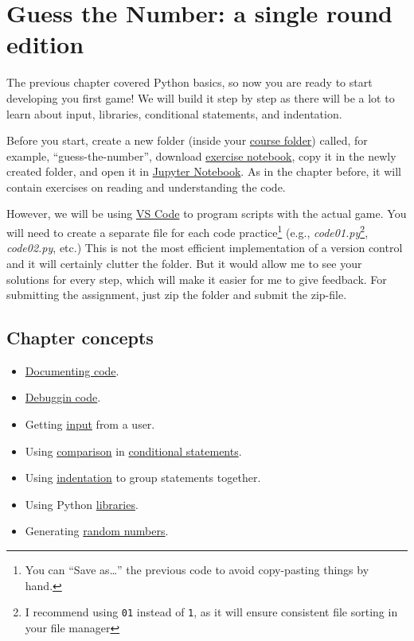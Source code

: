 \documentclass[
]{book}
\providecommand{\tightlist}{%
  \setlength{\itemsep}{0pt}\setlength{\parskip}{0pt}}
\begin{document}
\hypertarget{guess-the-number-single-round}{%
\chapter{Guess the Number: a single round edition}\label{guess-the-number-single-round}}

The previous chapter covered Python basics, so now you are ready to start developing you first game! We will build it step by step as there will be a lot to learn about input, libraries, conditional statements, and indentation.

Before you start, create a new folder (inside your \protect\hyperlink{files-folder}{course folder}) called, for example, ``guess-the-number'', download \href{notebooks/Seminar\%2002.\%20Guess\%20the\%20number\%20-\%20single\%20round.ipynb}{exercise notebook}, copy it in the newly created folder, and open it in \protect\hyperlink{jupyter-notebooks}{Jupyter Notebook}. As in the chapter before, it will contain exercises on reading and understanding the code.

However, we will be using \protect\hyperlink{install-vs-code}{VS Code} to program scripts with the actual game. You will need to create a separate file for each code practice\footnote{You can ``Save as\ldots{}'' the previous code to avoid copy-pasting things by hand.} (e.g., \emph{code01.py}\footnote{I recommend using \texttt{01} instead of \texttt{1}, as it will ensure consistent file sorting in your file manager}, \emph{code02.py}, etc.) This is not the most efficient implementation of a version control and it will certainly clutter the folder. But it would allow me to see your solutions for every step, which will make it easier for me to give feedback. For submitting the assignment, just zip the folder and submit the zip-file.

\hypertarget{chapter-concepts-1}{%
\section{Chapter concepts}\label{chapter-concepts-1}}

\begin{itemize}
\tightlist
\item
  \protect\hyperlink{documenting-your-code}{Documenting code}.
\item
  \protect\hyperlink{debugging}{Debuggin code}.
\item
  Getting \protect\hyperlink{input-function}{input} from a user.
\item
  Using \protect\hyperlink{comparisons}{comparison} in \protect\hyperlink{if-statement}{conditional statements}.
\item
  Using \protect\hyperlink{indentation}{indentation} to group statements together.
\item
  Using Python \href{l\#using-libraries}{libraries}.
\item
  Generating \protect\hyperlink{picking-a-number-randomly}{random numbers}.
\end{itemize}
\end{document}
